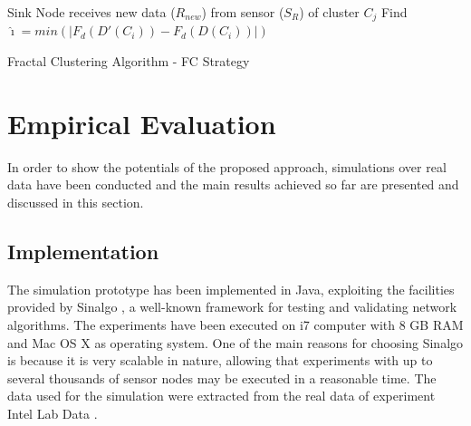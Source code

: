\documentclass{acm_proc_article-sp}
\begin{document}
\begin{algorithm}
 \SetAlgoLined
 \LinesNumbered
 \small
 Sink Node receives new data ($R_{new}$) from sensor ($S_{R}$) of cluster $C_j$\;
  Find $\hat{\imath} = min(|F_d(D'(C_i)) - F_d(D(C_i))|)$\;
 \caption{Fractal Clustering Algorithm - FC Strategy}
 \label{alg:MDFD}
\end{algorithm}


\section{Empirical Evaluation}
\label{eval}

In order to show the potentials of the proposed approach, simulations over real
data have been conducted and the main results achieved so far are presented and
discussed in this section. 

\subsection{Implementation}
\label{implementation}

The simulation prototype has been implemented in Java, exploiting the facilities
provided by Sinalgo \cite{Sinalgo2007}, a well-known framework for testing and
validating network algorithms. The experiments have been executed on i7 computer
with 8 GB RAM and Mac OS X as operating system.
One of the main reasons for choosing Sinalgo is because it is very scalable in
nature, allowing that experiments with up to several thousands of sensor nodes
may be executed in a reasonable time. The data used for the simulation were
extracted from the real data of experiment Intel Lab Data \cite{Intel2004}. 
\end{document}
